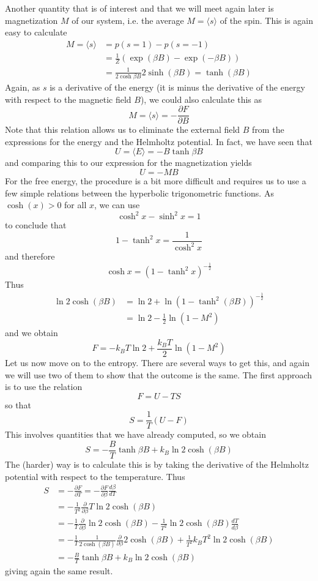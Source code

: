 \documentclass[a4paper, draft]{article}
\theoremstyle{own}
\theoremstyle{remark}
\begin{document}
Another quantity that is of interest and that we will meet again later is magnetization $M$ of our system, i.e. the average $M = \langle s\rangle$ of the spin. This is again easy to calculate
\begin{align*}
M = \langle s \rangle &= p(s = 1) - p(s = -1) \\
&= \frac{1}{Z} (\exp(\beta B) - \exp(-\beta B)) \\
&=  \frac{1}{2 \cosh \beta B} 2 \sinh(\beta B) =  \tanh(\beta B)
\end{align*}
Again, as $s$ is a derivative of the energy (it is minus the derivative of the energy with respect to the magnetic field $B$), we could also calculate this as 
$$
M = \langle s \rangle = - \frac{\partial F}{\partial B}
$$
Note that this relation allows us to eliminate the external field $B$ from the expressions for the energy and the Helmholtz potential. In fact, we have seen that
$$
U = \langle E \rangle = - B \tanh \beta B
$$
and comparing this to our expression for the magnetization yields
$$
U = - M B
$$
For the free energy, the procedure is a bit more difficult and requires us to use a few simple relations between the hyperbolic trigonometric functions. As $\cosh(x) > 0$ for all $x$, we can use
$$
\cosh^2 x - \sinh^2 x  = 1
$$
to conclude that
$$
1 - \tanh^2 x = \frac{1}{\cosh^2 x} 
$$
and therefore
$$
\cosh x = (1 - \tanh^2 x)^{- \frac{1}{2}}
$$
Thus
\begin{align*}
\ln 2 \cosh(\beta B)   &=  \ln 2 + \ln (1 - \tanh^2 (\beta B))^{- \frac{1}{2}} \\
&= \ln 2 - \frac{1}{2} \ln (1 - M^2) 
\end{align*}
and we obtain
$$
F = - k_B T \ln 2 +  \frac{k_B T}{2} \ln (1 - M^2) 
$$
Let us now move on to the entropy. There are several ways to get this, and again we will use two of them to show that the outcome is the same. The first approach is to use the relation
$$
F = U - TS
$$
so that
$$
S = \frac{1}{T}(U - F)
$$
This involves quantities that we have already computed, so we obtain
$$
S = -  \frac{B}{T}  \tanh \beta B + k_B  \ln 2 \cosh(\beta B)
$$
The (harder) way is to calculate this is by taking the derivative of the Helmholtz potential with respect to the temperature. Thus
\begin{align*}
S &= - \frac{\partial F}{\partial T} = - \frac{\partial F}{\partial \beta} \frac{d \beta}{dT}  \\
&=  - \frac{1}{T^2} \frac{\partial}{\partial \beta}  T \ln 2 \cosh(\beta B) \\
&=  - \frac{1}{T} \frac{\partial}{\partial \beta}  \ln 2 \cosh(\beta B) - \frac{1}{T^2} \ln 2 \cosh(\beta B) \frac{dT}{d\beta} \\
&=  - \frac{1}{T} \frac{1}{2 \cosh(\beta B)} \frac{\partial}{\partial \beta} 2 \cosh(\beta B) + \frac{1}{T^2} k_B T^2 \ln 2 \cosh(\beta B) \\
&= - \frac{B}{T} \tanh \beta B + k_B \ln 2 \cosh(\beta B)
\end{align*}
giving again the same result. 
\end{document}
